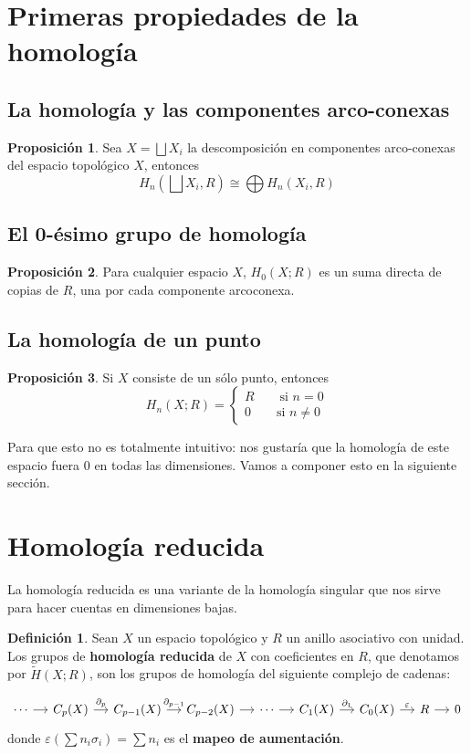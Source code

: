\documentclass[spanish]{book}
\theoremstyle{definition}
\newtheorem*{defn}{Definición}
\newtheorem*{prop}{Proposición}
\begin{document}
\section{Primeras propiedades de la homología}
\subsection{La homología y las componentes arco-conexas}
\begin{prop}
	Sea $X=\bigsqcup X_i$ la descomposición en componentes arco-conexas del espacio topológico $X$, entonces
	\[H_n(\bigsqcup X_i,R)\cong \bigoplus H_n(X_i,R)\]
\end{prop}
\subsection{El 0-ésimo grupo de homología}
\begin{prop}
	Para cualquier espacio $X$, $H_0(X;R)$ es un suma directa de copias de $R$, una por cada componente arcoconexa.
\end{prop}
\subsection{La homología de un punto}
	 \begin{prop}
	 	Si $X$ consiste de un sólo punto, entonces
	 	\[H_n(X;R)=\begin{cases}R\qquad\text{si   } n=0\\
	 	0\qquad\text{si   } n\neq0
		 \end{cases}\]
	\end{prop}
	Para que esto no es totalmente intuitivo: nos gustaría que la homología de este espacio fuera 0 en todas las dimensiones. Vamos a componer esto en la siguiente sección.
\section{Homología reducida}\label{sec:6.4}
	La homología reducida es una variante de la homología singular que nos sirve para hacer cuentas en dimensiones bajas.
	
	\begin{defn}
		Sean $X$ un espacio topológico y $R$ un anillo asociativo con unidad. Los grupos de \textbf{homología reducida} de $X$ con coeficientes en $R$, que denotamos por $\tilde{H}(X;R)$, son los grupos de homología del siguiente complejo de cadenas:
	
		\[\begin{tikzcd}[column sep=small]
			\cdots \arrow[r] & C_p(X) \arrow[r, "\partial_p"] & C_{p-1}(X) \arrow[r, "\partial_{p-1}"] & C_{p-2}(X) \arrow[r] & \cdots \arrow[r] & C_1(X) \arrow[r, "\partial_1"] & C_0(X) \arrow[r, "\varepsilon"] & R \arrow[r] & 0
		\end{tikzcd}\]
		donde $\varepsilon(\sum n_i\sigma_i)=\sum n_i$ es el \textbf{mapeo de aumentación}.
	\end{defn}
	
\end{document}

